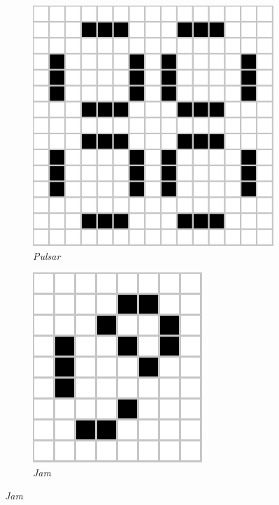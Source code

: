 \documentclass[../proyecto.tex]{memoir}
\begin{document}
\begin{figure}[H]
	\centering
	\begin{subfigure}[b]{0.3\linewidth} 
        \centering
        \includegraphics[height=0.95\linewidth]{./images/pulsar.png}
        \caption{\textit{Pulsar}}
        \label{fig:pulsar}
    \end{subfigure}
    \quad
	\begin{subfigure}[b]{0.3\linewidth} 
        \centering
        \includegraphics[height=0.7\linewidth]{./images/jam.png}
        \caption{\textit{Jam}}
        \label{fig:jam}

\end{subfigure}
\end{figure}
\end{document}

